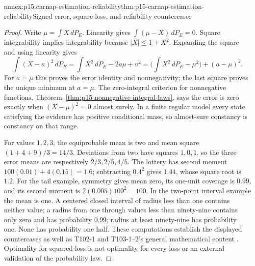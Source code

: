 \begin{annexitem}{annex:p15.carnap-estimation-reliability}{thm:p15-carnap-estimation-reliability}{Signed error, square loss, and reliability countercases}
\begin{proof}
Write \(\mu=\int X\,dP_E\). Linearity gives
\(\int(\mu-X)\,dP_E=0\). Square integrability implies
integrability because \(|X|\leq1+X^2\). Expanding the square and
using linearity gives
\[
 \int(X-a)^2\,dP_E=\int X^2\,dP_E-2a\mu+a^2
 =\bigl(\int X^2\,dP_E-\mu^2\bigr)+(a-\mu)^2.
\]
For \(a=\mu\) this proves the error identity and nonnegativity;
the last square proves the unique minimum at \(a=\mu\).
The zero-integral criterion for nonnegative functions,
Theorem~\ref{thm:p15-nonnegative-integral-laws}, says the error is
zero exactly when \((X-\mu)^2=0\) almost surely. In a finite
regular model every state satisfying the evidence has positive
conditional mass, so almost-sure constancy is constancy on that range.

For values \(1,2,3\), the equiprobable mean is two and mean square
\((1+4+9)/3=14/3\). Deviations from two have squares \(1,0,1\),
so the three error means are respectively \(2/3,2/5,4/5\).
The lottery has second moment \(100(0.01)+4(0.15)=1.6\);
subtracting \(0.4^2\) gives \(1.44\), whose square root is
\(1.2\). For the tail example, symmetry gives mean zero, its
one-unit coverage is \(0.99\), and its second moment is
\(2(0.005)100^2=100\). In the two-point interval example the mean
is one. A centered closed interval of radius less than one contains
neither value; a radius from one through values less than ninety-nine
contains only zero and has probability \(0.99\); radius at least
ninety-nine has probability one. None has probability one half.
These computations establish the displayed countercases as well as
T102-1 and T103-1--2's general mathematical content
\cite{Carnap1950Probability}. Optimality for squared loss is not
optimality for every loss or an external validation of the probability law.
\end{proof}
\end{annexitem}

